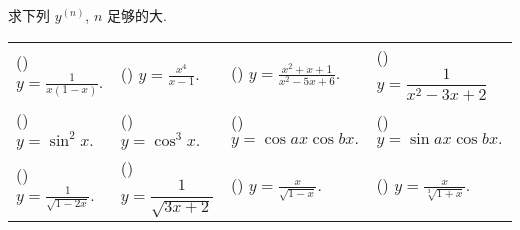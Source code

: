 \begin{example}
    求下列 $y^{(n)}$, $n$ 足够的大.
    \setcounter{magicrownumbers}{0}
    \begin{table}[H]
        \centering
        \begin{tabular}{l | l | l | l}
            (\rownumber{}) $\displaystyle y=\frac{1}{x(1-x)}.$      & (\rownumber{}) $\displaystyle y=\frac{x^4}{x-1}.$ & (\rownumber{}) $\displaystyle y=\frac{x^2+x+1}{x^2-5x+6}.$ & (\rownumber{}) $y=\dfrac{1}{x^2-3x+2}$                    \\
            (\rownumber{}) $\displaystyle y=\sin^2x.$               & (\rownumber{}) $y=\cos^3x.$                       & (\rownumber{}) $y=\cos ax\cos bx.$                         & (\rownumber{}) $y=\sin ax\cos bx.$                        \\
            (\rownumber{}) $\displaystyle y=\frac{1}{\sqrt{1-2x}}.$ & (\rownumber{}) $y=\dfrac{1}{\sqrt{3x+2}}$         & (\rownumber{}) $\displaystyle y=\frac{x}{\sqrt{1-x}}.$     & (\rownumber{}) $\displaystyle y=\frac{x}{\sqrt[3]{1+x}}.$
        \end{tabular}
    \end{table}
\end{example}
